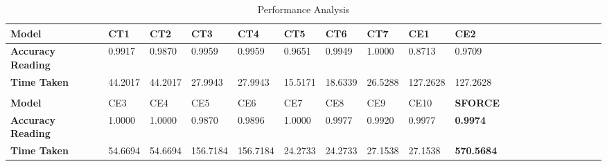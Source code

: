 \documentclass[final,1p,times,twocolumn]{elsarticle}
\begin{document}
\begin{table}[!t]
\scriptsize
\caption{Performance Analysis}
\label{table:t1}
\centering
\scalebox{0.95}
{
\begin{tabular}{| l | l | l | l | l | l | l | l | l | l | l | l | l | l | l | l | l | l | l | l |}
\hline
\textbf{Model} & {CT1} & {CT2} & {CT3} & {CT4} & {CT5} & {CT6} & {CT7} & {CE1} & {CE2}\\
\hline
\textbf{Accuracy Reading}& 0.9917 & 0.9870 & 0.9959 & 0.9959 & 0.9651 & 0.9949 & 1.0000 & 0.8713 & 0.9709\\
\hline
\textbf{Time Taken}& 44.2017 & 44.2017 & 27.9943 & 27.9943 & 15.5171 & 18.6339 & 26.5288 & 127.2628 & 127.2628\\
\hline
&&&&&&&&&\\
\hline
\textbf{Model} & {CE3} & {CE4} & {CE5} & {CE6} & {CE7} & {CE8} & {CE9} & {CE10} & \textbf{SFORCE} \\
\hline
\textbf{Accuracy Reading}& 1.0000 & 1.0000 & 0.9870 & 0.9896 & 1.0000 & 0.9977 & 0.9920 & 0.9977 & \textbf{0.9974} \\
\hline
\textbf{Time Taken}& 54.6694 & 54.6694 & 156.7184 & 156.7184 & 24.2733 & 24.2733 & 27.1538 & 27.1538 & \textbf{570.5684} \\
\hline
\end{tabular}
}
\end{table}
% 
\end{document}
